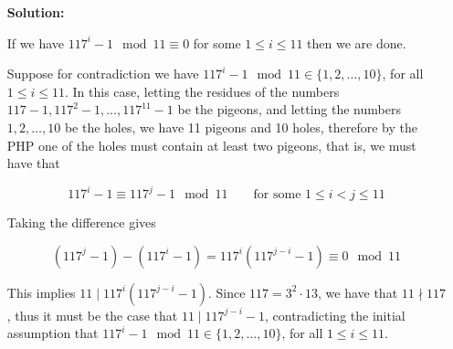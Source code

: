 \documentclass[twoside]{article}
\theoremstyle{mystyle}
\begin{document}
\begin{enumerate}
\item[{\bfseries Solution:}] 

If we have $117^i - 1 \mod 11 \equiv 0$ for some $1 \le i \le 11$ then we are done. 

Suppose for contradiction we have $117^i -1 \mod 11 \in \{1, 2, \ldots, 10\}$, for all $1 \le i \le 11$. In this case, letting the residues of the numbers $117-1, 117^2-1,...,117^{11}-1$ be the pigeons, and letting the numbers $1, 2, \ldots, 10$ be the holes, we have 11 pigeons and 10 holes, therefore by the PHP one of the holes must contain at least two pigeons, that is, we must have that 

\[117^i - 1 \equiv 117^j - 1 \mod 11 \qquad \text{for some $1 \le i < j \le 11$}\]

Taking the difference gives 

\[(117^j - 1) - (117^i - 1) = 117^i(117^{j-i}-1) \equiv 0 \mod 11\]

This implies $11 \mid 117^i(117^{j-i}-1)$. Since $117 = 3^2\cdot 13$, we have that $11 \nmid 117$, thus it must be the case that $11 \mid 117^{j-i}-1$, contradicting the initial assumption that $117^i -1 \mod 11 \in \{1, 2, \ldots, 10\}$, for all $1 \le i \le 11$. 

\end{enumerate}




  
\end{document}
